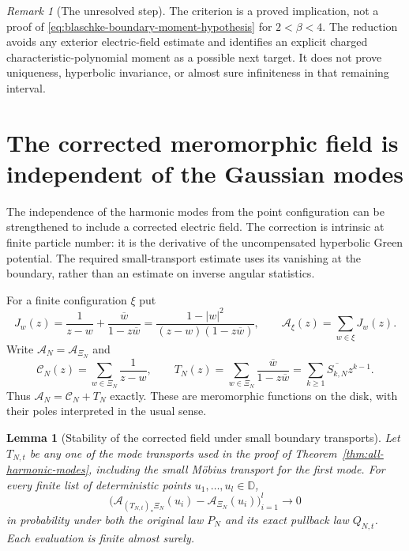 \documentclass[11pt,a4paper]{article}
\numberwithin{equation}{section}
\newtheorem{lemma}[theorem]{Lemma}
\theoremstyle{definition}
\theoremstyle{remark}
\newtheorem{remark}[theorem]{Remark}
\newcommand{\D}{\mathbb D}
\begin{document}
\begin{remark}[The unresolved step]
The criterion is a proved implication, not a proof of
\eqref{eq:blaschke-boundary-moment-hypothesis} for $2<\beta<4$.
The reduction avoids any exterior electric-field estimate and
identifies an explicit charged characteristic-polynomial moment
as a possible next target. It does not prove uniqueness, hyperbolic
invariance, or almost sure infiniteness in that remaining interval.
\end{remark}

\section{The corrected meromorphic field is independent of the Gaussian modes}
\label{sec:gaussian-separation-meromorphic-field}

The independence of the harmonic modes from the point configuration can
be strengthened to include a corrected electric field. The correction
is intrinsic at finite particle number: it is the derivative of the
uncompensated hyperbolic Green potential. The required small-transport
estimate uses its vanishing at the boundary, rather than an estimate
on inverse angular statistics.

For a finite configuration $\xi$ put
\[
 J_w(z)=\frac1{z-w}+\frac{\overline w}{1-z\overline w}
       =\frac{1-|w|^2}{(z-w)(1-z\overline w)},\qquad
 \mathcal A_\xi(z)=\sum_{w\in\xi}J_w(z).
\]
Write $\mathcal A_N=\mathcal A_{\Xi_N}$ and
\[
 \mathcal C_N(z)=\sum_{w\in\Xi_N}\frac1{z-w},\qquad
 T_N(z)=\sum_{w\in\Xi_N}\frac{\overline w}{1-z\overline w}
       =\sum_{k\ge1}\overline{S_{k,N}}z^{k-1}.
\]
Thus $\mathcal A_N=\mathcal C_N+T_N$ exactly. These are meromorphic
functions on the disk, with their poles interpreted in the usual sense.

\begin{lemma}[Stability of the corrected field under small boundary transports]
\label{lem:green-force-small-transport-stability}
Let $T_{N,t}$ be any one of the mode transports used in the proof of
Theorem~\ref{thm:all-harmonic-modes}, including the small M\"obius
transport for the first mode. For every finite list of deterministic
points $u_1,\ldots,u_l\in\D$,
\[
 \bigl(\mathcal A_{(T_{N,t})_*\Xi_N}(u_i)
             -\mathcal A_{\Xi_N}(u_i)\bigr)_{i=1}^l
       \longrightarrow0
\]
in probability under both the original law $P_N$ and its exact
pullback law $Q_{N,t}$. Each evaluation is finite almost surely.
\end{lemma}
\end{document}
